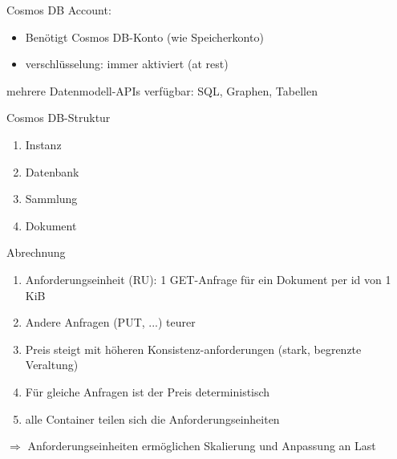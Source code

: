 

\begin{flashcard}[Definition]{Cosmos DB}
    Account:
    \begin{itemize}
        \item Benötigt Cosmos DB-Konto (wie Speicherkonto)
        \item verschlüsselung: immer aktiviert (at rest)
    \end{itemize}
    mehrere Datenmodell-APIs verfügbar: SQL, Graphen, Tabellen
\end{flashcard}

\begin{flashcard}[Definition]{Cosmos DB-Struktur}
    \begin{enumerate}
        \item Instanz
        \item Datenbank
        \item Sammlung
        \item Dokument
    \end{enumerate}
\end{flashcard}

\begin{flashcard}[Definition]{Abrechnung}
    \begin{enumerate}
        \item Anforderungseinheit (RU): 1 GET-Anfrage für ein Dokument per id von 1 KiB
        \item Andere Anfragen (PUT, ...) teurer
        \item Preis steigt mit höheren Konsistenz-anforderungen (stark, begrenzte Veraltung)
        \item Für gleiche Anfragen ist der Preis deterministisch
        \item alle Container teilen sich die Anforderungseinheiten
    \end{enumerate}
    $\Rightarrow$ Anforderungseinheiten ermöglichen Skalierung und Anpassung an Last
\end{flashcard}

